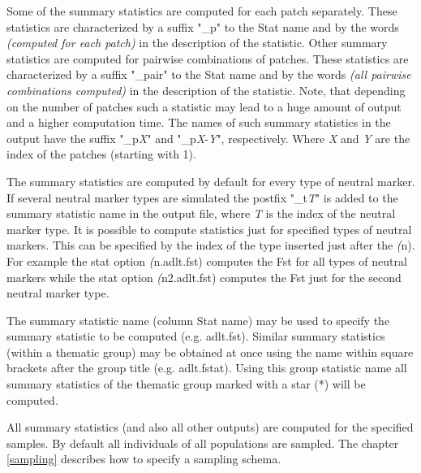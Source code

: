 \documentclass[letterpaper,12pt,oneside]{book}
\begin{document}
Some of the summary statistics are computed for each patch separately. These statistics are characterized by a suffix "\_p" to the \textsf{Stat name} and by the words \textit{(computed for each patch)} in the description of the statistic. Other summary statistics are computed for pairwise combinations of patches. These statistics are characterized by a suffix "\_pair" to the \textsf{Stat name} and by the words \textit{(all pairwise combinations computed)} in the description of the statistic. Note, that depending on the number of patches such a statistic may lead to a huge amount of output and a higher computation time. The names of such summary statistics in the output have the suffix "\_p\textit{X}" and "\_p\textit{X}-\textit{Y}", respectively. Where \textit{X} and \textit{Y} are the index of the patches (starting with 1). 

The summary statistics are computed by default for every type of neutral marker. If several neutral marker types are simulated the postfix "\_t\textit{T}" is added to the summary statistic name in the output file, where \textit{T} is the index of the neutral marker type. It is possible to compute statistics just for specified types of neutral markers. This can be specified by the index of the type inserted just after the \textit(n). For example the stat option \textit(n.adlt.fst) computes the Fst for all types of neutral markers while the stat option \textit(n2.adlt.fst) computes the Fst just for the second neutral marker type. 

The summary statistic name (column \textsf{Stat name}) may be used to specify the summary statistic to be computed (e.g. \textsf{adlt.fst}). Similar summary statistics (within a thematic group) may be obtained at once using the name within square brackets after the group title (e.g. \textsf{adlt.fstat}). Using this group statistic name all summary statistics of the thematic group marked with a star (*) will be computed. 

All summary statistics (and also all other outputs) are computed for the specified samples. By default all individuals of all populations are sampled. The chapter \ref{sampling} describes how to specify a sampling schema.
\\
\\
\end{document}
